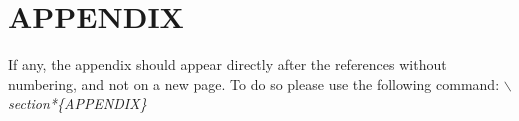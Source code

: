 \documentclass[a4paper,twoside]{style/article}
\begin{document}
\vfill

{\small
}


\section*{\uppercase{Appendix}}

\noindent If any, the appendix should appear directly after the
references without numbering, and not on a new page. To do so please use the following command:
\textit{$\backslash$section*\{APPENDIX\}}

\vfill
\end{document}
